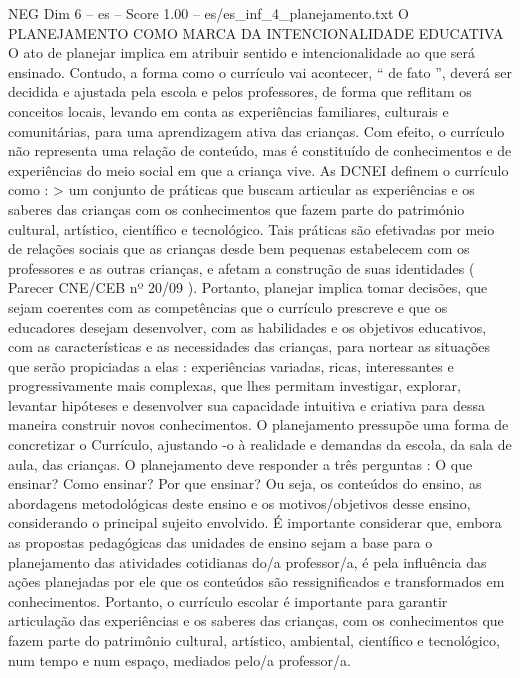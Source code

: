 \begin{textsample}{NEG Dim 6 – es – Score 1.00 – es/es\_inf\_4\_planejamento.txt}  \label{ex:f6_neg_148}
O PLANEJAMENTO COMO MARCA DA INTENCIONALIDADE EDUCATIVA O ato de planejar implica em atribuir sentido e intencionalidade ao que será ensinado.
Contudo, a forma como o currículo vai acontecer, “ de fato ”, deverá ser decidida e ajustada pela escola e pelos professores, de forma que reflitam os conceitos locais, levando em conta as experiências familiares, culturais e comunitárias, para uma aprendizagem ativa das crianças.
Com efeito, o currículo não representa uma relação de conteúdo, mas é constituído de conhecimentos e de experiências do meio social em que a criança vive.
As DCNEI definem o currículo como : > um conjunto de práticas que buscam articular as experiências e os saberes das crianças com os conhecimentos que fazem parte do património cultural, artístico, científico e tecnológico.
Tais práticas são efetivadas por meio de relações sociais que as crianças desde bem pequenas estabelecem com os professores e as outras crianças, e afetam a construção de suas identidades ( Parecer CNE/CEB nº 20/09 ).
Portanto, planejar implica tomar decisões, que sejam coerentes com as competências que o currículo prescreve e que os educadores desejam desenvolver, com as habilidades e os objetivos educativos, com as características e as necessidades das crianças, para nortear as situações que serão propiciadas a elas : experiências variadas, ricas, interessantes e progressivamente mais complexas, que lhes permitam investigar, explorar, levantar hipóteses e desenvolver sua capacidade intuitiva e criativa para dessa maneira construir novos conhecimentos.
O planejamento pressupõe uma forma de concretizar o Currículo, ajustando -o à realidade e demandas da escola, da sala de aula, das crianças.
O planejamento deve responder a três perguntas : O que ensinar?
Como ensinar?
Por que ensinar?
Ou seja, os conteúdos do ensino, as abordagens metodológicas deste ensino e os motivos/objetivos desse ensino, considerando o principal sujeito envolvido.
É importante considerar que, embora as propostas pedagógicas das unidades de ensino sejam a base para o planejamento das atividades cotidianas do/a professor/a, é pela influência das ações planejadas por ele que os conteúdos são ressignificados e transformados em conhecimentos.
Portanto, o currículo escolar é importante para garantir articulação das experiências e os saberes das crianças, com os conhecimentos que fazem parte do patrimônio cultural, artístico, ambiental, científico e tecnológico, num tempo e num espaço, mediados pelo/a professor/a.

\end{textsample}
